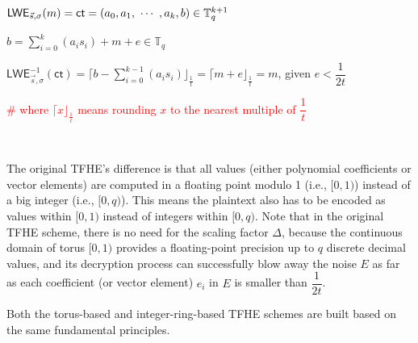 $\textsf{LWE}_{\vec{s}, \sigma}(m) = \textsf{ct} = (a_0, a_1, \text{ } \text{$\cdots$} \text{ }, a_k, b) \in \mathbb{T}_{q}^{k+1}$

$b = \sum\limits_{i=0}^{k}(a_is_i) + m + e \in \mathbb{T}_q$

$\textsf{LWE}_{\vec{s}, \sigma}^{-1}(\textsf{ct}) =  \Big\lceil b - \sum\limits_{i=0}^{k-1}(a_is_i) \Big\rfloor_{\frac{1}{t}} = \Big\lceil m + e \Big\rfloor_{\frac{1}{t}} = m$, given $e < \dfrac{1}{2t}$  

\textcolor{red}{\# where $\lceil x \rfloor_{\frac{1}{t}}$ means rounding $x$ to the nearest multiple of $\dfrac{1}{t}$}

$ $

The original TFHE's difference is that all values (either polynomial coefficients or vector elements) are computed in a floating point modulo 1 (i.e., $[0, 1)$) instead of a big integer (i.e., $[0, q)$). This means the plaintext also has to be encoded as values within $[0, 1)$ instead of integers within $[0, q)$. Note that in the original TFHE scheme, there is no need for the scaling factor $\Delta$, because the continuous domain of torus $[0, 1)$ provides a floating-point precision up to $q$ discrete decimal values, and its decryption process can successfully blow away the noise $E$ as far as each coefficient (or vector element) $e_i$ in $E$ is smaller than $\dfrac{1}{2t}$. 

Both the torus-based and integer-ring-based TFHE schemes are built based on the same fundamental principles.